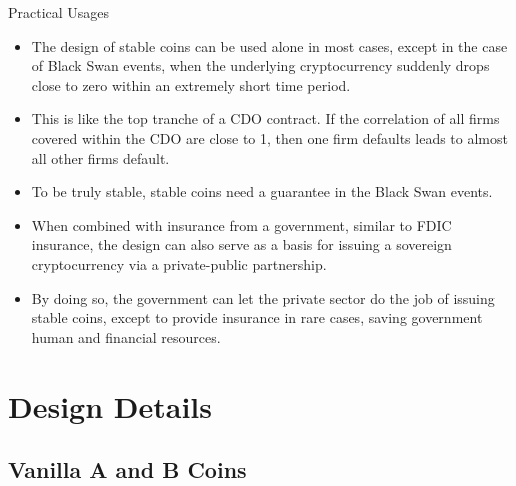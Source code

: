 \documentclass[notes=show, beamer, handout]{beamer}
\begin{document}
\begin{frame}{Practical Usages}
\begin{itemize}
\item The design of stable coins can be used alone in most cases, except in the case of Black Swan events, when the underlying cryptocurrency suddenly drops close to zero within an extremely short time period.
\item This is like the top tranche of a CDO contract. If the correlation of all firms covered within the CDO are close to 1, then one firm defaults leads to almost all other firms default.
\item To be truly stable, stable coins need a guarantee in the Black Swan events.
\item When combined with insurance from a government, similar to FDIC insurance, the design can also serve as a basis for issuing a sovereign cryptocurrency via a private-public partnership.
\item By doing so, the government can let the private sector do the job of issuing stable coins, except to provide insurance in rare cases, saving government human and financial resources.
\end{itemize}
\end{frame}

\section{Design Details}


\subsection{Vanilla A  and B Coins}
\end{document}
